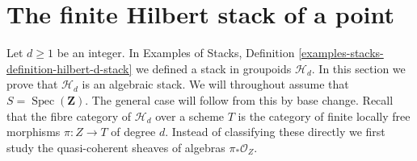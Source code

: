 \documentclass{stacks-project}
\theoremstyle{plain}
\theoremstyle{definition}
\theoremstyle{remark}
\numberwithin{equation}{subsection}
\def\Spec{\mathop{\mathrm{Spec}}}
\begin{document}
\section{The finite Hilbert stack of a point}
\label{section-hilbert-point}

\noindent
Let $d \geq 1$ be an integer. In
Examples of Stacks, Definition \ref{examples-stacks-definition-hilbert-d-stack}
we defined a stack in groupoids $\mathcal{H}_d$.
In this section we prove that $\mathcal{H}_d$ is an
algebraic stack. We will throughout assume that
$S = \Spec(\mathbf{Z})$.
The general case will follow from this by base change.
Recall that the fibre category of $\mathcal{H}_d$ over a scheme $T$
is the category of finite locally free morphisms $\pi : Z \to T$ of
degree $d$. Instead of classifying these directly we first
study the quasi-coherent sheaves of algebras $\pi_*\mathcal{O}_Z$.
\end{document}
